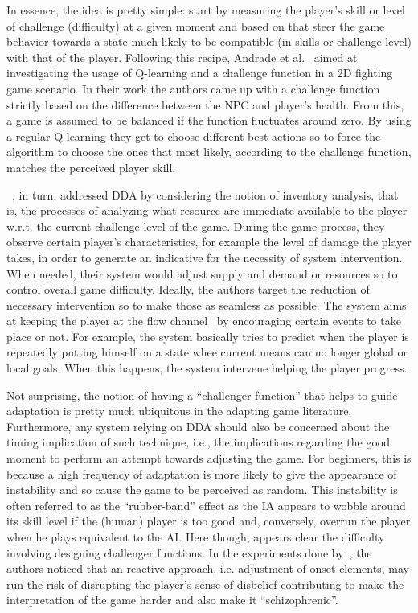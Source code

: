 In essence, the idea is pretty simple: start by measuring the player's skill or level of challenge (difficulty) at a given moment and based on that steer the game behavior towards a state much likely to be compatible (in skills or challenge level) with that of the player. Following this recipe, Andrade et al.~\cite{andrade2004online, andrade2005extending} aimed at investigating the usage of Q-learning and a challenge function in a 2D fighting game scenario. In their work the authors came up with a challenge function strictly based on the difference between the NPC and player's health. From this, a game is assumed to be balanced if the function fluctuates around zero. By using a regular Q-learning they get to choose different best actions so to force the algorithm to choose the ones that most likely, according to the challenge function, matches the perceived player skill. 

~\cite{hunicke2004ai}, in turn, addressed DDA by considering the notion of inventory analysis, that is, the processes of analyzing what resource are immediate available to the player w.r.t. the current challenge level of the game. During the game process, they observe certain player's characteristics, for example the level of damage the player takes, in order to generate an indicative for the necessity of system intervention. When needed, their system would adjust supply and demand or resources so to control overall game difficulty. Ideally, the authors target the reduction of necessary intervention so to make those as seamless as possible. The system aims at keeping the player at the flow channel~\cite{Csikszentmihalyi91} by encouraging certain events to take place or not. For example, the system basically tries to predict when the player is repeatedly putting himself on a state whee current means can no longer global or local goals. When this happens, the system intervene helping the player progress.

Not surprising, the notion of having a ``challenger function'' that helps to guide adaptation is pretty much ubiquitous in the adapting game literature. Furthermore, any system relying on DDA should also be concerned about the timing implication of such technique, i.e., the implications regarding the good moment to perform an attempt towards adjusting the game. For beginners, this is because a high frequency of adaptation is more likely to give the appearance of instability and so cause the game to be perceived as random. This instability is often referred to as the ``rubber-band'' effect as the IA appears to wobble around its skill level if the (human) player is too good and, conversely, overrun the player when he plays equivalent to the AI. Here though, appears clear the difficulty involving designing challenger functions. In the experiments done by~\cite{hunicke2004ai}, the authors noticed that an reactive approach, i.e. adjustment of onset elements, may run the risk of disrupting the player's sense of disbelief contributing to make the interpretation of the game harder and also make it ``schizophrenic''.

